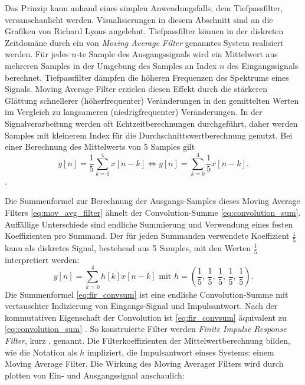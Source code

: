 Das Prinzip kann anhand eines simplen Anwendungsfalls, dem Tiefpassfilter, versanschaulicht werden.
Visualisierungen in diesem Abschnitt sind an die Grafiken von Richard Lyons \cite[Kapitel 5]{lyons2010} angelehnt.
Tiefpassfilter können in der diskreten Zeitdomäne durch ein von \cite[Kapitel 5, Seite 220]{lyons2010} \textit{Moving Average Filter} genanntes System realisiert werden.
Für jedes $n$-te Sample des Ausgangssignals wird ein Mittelwert aus mehreren Samples in der Umgebung des Samples an Index $n$ des Eingangssignals berechnet.
Tiefpassfilter dämpfen die höheren Frequenzen des Spektrums eines Signals. Moving Average Filter erzielen diesen Effekt
durch die stärkeren Glättung schnellerer (höherfrequenter) Veränderungen in den gemittelten Werten im Vergleich zu langsameren (niedrigfrequenter) Veränderungen.
In der Signalverarbeitung werden oft Echtzeitberechnungen durchgeführt, daher werden Samples mit kleinerem Index für die 
Durchschnittswertberechnung genutzt. Bei einer Berechnung des Mittelwerts von 5 Samples gilt
\begin{equation}
    y[n]=\frac{1}{5}\sum_{k=0}^4x[n-k]\iff y[n]=\sum_{k=0}^4\frac{1}{5}x[n-k].
    \label{eq:mov_avg_filter}
\end{equation}
\cite[Kapitel 5, Seite 172]{lyons2010}.

Die Summenformel zur Berechnung der Ausgangs-Samples dieses Moving Average Filters \ref{eq:mov_avg_filter} ähnelt der Convolution-Summe \ref{eq:convolution_sum}.
Auffällige Unterschiede sind endliche Summierung und Verwendung eines festen Koeffizienten pro Summand.
Der für jeden Summanden verwendete Koeffizient $\frac{1}{5}$ kann als diskretes Signal, bestehend aus 5 Samples, mit den Werten $\frac{1}{5}$ interpretiert werden:
\begin{equation}
    \label{eq:fir_convsum}
    y[n]=\sum_{k=0}^4h[k]x[n-k]\text{ mit }h=\left(\frac{1}{5},\,\frac{1}{5},\,\frac{1}{5},\,\frac{1}{5},\,\frac{1}{5}\right).
\end{equation}
Die Summenformel \ref{eq:fir_convsum} ist eine endliche Convolution-Summe mit vertauschter Indizierung von Eingangs-Signal und Impulsantwort. Nach der
kommutativen Eigenschaft der Convolution ist \ref{eq:fir_convsum} äquivalent zu \ref{eq:convolution_sum} \cite[Kapitel 2, Seite 29]{oppenheim1999}. So konstruierte Filter werden \textit{Finite Impulse Response Filter},
kurz , genannt. Die Filterkoeffizienten der Mittelwertberechnung bilden, wie die Notation als $h$ impliziert, die Impulsantwort einses Systems: einem
Moving Average Filter. Die Wirkung des Moving Averager Filters wird durch plotten von Ein- und Ausgangssignal anschaulich:

